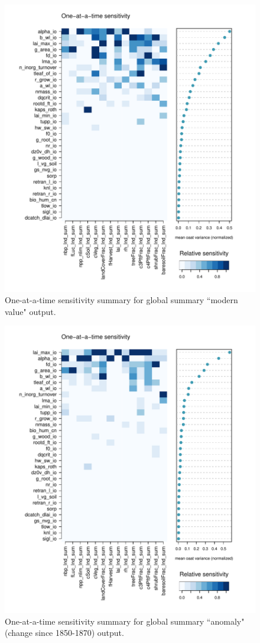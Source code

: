 \documentclass[gmd, manuscript]{copernicus}
\begin{document}
\begin{figure}[t]
\includegraphics[width=12cm]{./graphics/oat_var_sensmat_level1a_wave01_Y}
\caption{One-at-a-time sensitivity summary for global summary ``modern value" output.}
\label{fig:oat_var_sensmat_level1a_wave01_Y}
\end{figure}

\begin{figure}[t]
\includegraphics[width=12cm]{./graphics/oat_var_sensmat_level1a_wave01_YAnom}
\caption{One-at-a-time sensitivity summary for global summary ``anomaly" (change since 1850-1870) output.}
\label{fig:oat_var_sensmat_level1a_wave01_Anom}
\end{figure}
\end{document}
